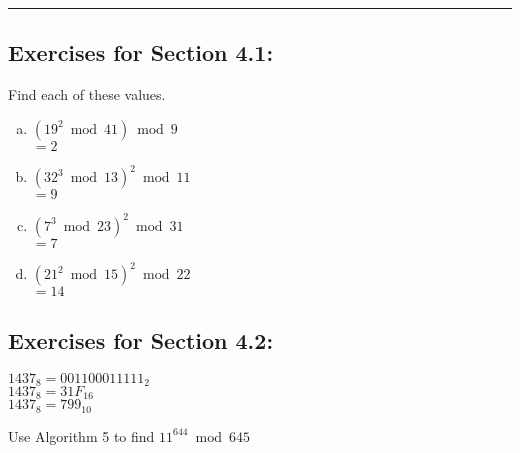 \documentclass[12pt]{article}  %
\begin{document}
\rule{6in}{.1pt}       %


\subsection*{Exercises for Section 4.1:}     


\noindent Find each of these values.
\begin{enumerate}[a)]
    \item $(19^2\bmod{41})\bmod{9}$\\
    $=2$
    \item $(32^3\bmod{13})^2\bmod{11}$\\
    $=9$
    \item $(7^3\bmod{23})^2\bmod{31}$\\
    $=7$
    \item $(21^2\bmod{15})^2\bmod{22}$\\
    $=14$
\end{enumerate}

\subsection*{Exercises for Section 4.2:}     


\noindent
$1437_8=001100011111_{2}$\\
$1437_8=31F_{16}$\\
$1437_8=799_{10}$


\noindent
Use Algorithm 5 to find $11^{644}\bmod{645}$
\end{document}
